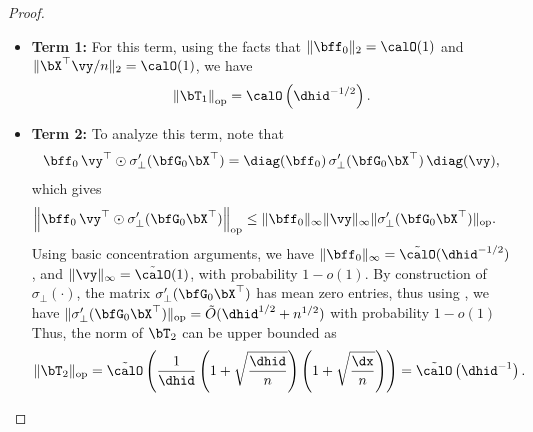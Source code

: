\begin{proof}
    \begin{itemize}
        \item \textbf{Term 1:} For this term, using the facts that $\|\bff_0\|_2 = \calO(1)$ and $\|\bX^\top \vy/n\|_2 = \calO(1)$, we have
        \begin{align*}
            \left\|\bT_1\right\|_{\rm op} = \calO\left({ \dhid^{-1/2}} \right).
        \end{align*}
        \item \textbf{Term 2:} To analyze this term, note that
        \begin{align*}
            \bff_0\, \vy^\top \odot \sigma_\perp'(\bfG_0 \bX^\top) = \diag(\bff_0)\,  \sigma_\perp'(\bfG_0 \bX^\top)\,\diag(\vy),
        \end{align*}
        which gives
        \begin{align*}
            \left\|\bff_0\, \vy^\top \odot \sigma_\perp'(\bfG_0 \bX^\top)\right\|_{\rm op} &\leq \|\bff_0\|_{\rm \infty}\|\vy\|_{\rm \infty} \|\sigma_\perp'(\bfG_0 \bX^\top)\|_{\rm op}. %
        \end{align*}
        Using basic concentration arguments, we have $\|\bff_0\|_{\rm \infty} = \tilde \calO(\dhid^{-1/2})$, and $\|\vy\|_{\rm \infty} = \tilde \calO(1)$, with probability $1 - o(1)$. By construction of $\sigma_\perp(\cdot)$, the matrix $\sigma_\perp'(\bfG_0 \bX^\top)$ has mean zero entries, thus using \citep[Theorem 5.44]{vershynin2010introduction}, we have $\|\sigma_\perp'(\bfG_0 \bX^\top)\|_{\rm op} = \tilde{O}(\dhid^{1/2} + n^{1/2})$ with probability $1 - o(1)$ Thus, the norm of $\bT_2$ can be upper bounded as
        \begin{align*}
            \|\bT_2\|_{\rm op} = \tilde \calO\left(\frac{1}{ \dhid}\left(1 + \sqrt\frac{\dhid}{n}\right)\left(1 + \sqrt\frac{\dx}{n}\right)\right) = \tilde{\calO}\left(\dhid^{-1}\right).
        \end{align*}
        

\end{itemize}
\end{proof}
